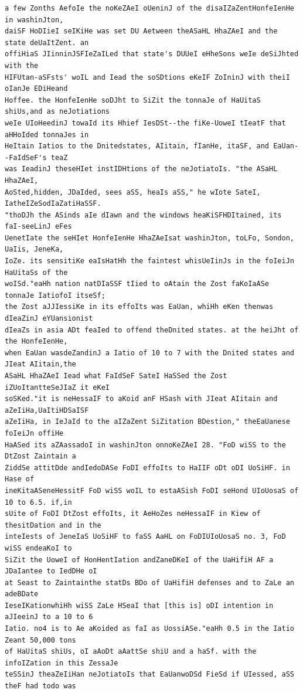 \documentclass[11pt,a4paper]{article}
\begin{document}
\begin{lstlisting}[style=ciphertext,caption={Complete text after iteration 7}]
a few Zonths AefoIe the noKeZAeI oUeninJ of the disaIZaZentHonfeIenHe in washinJton,
daiSF HoDIieI seIKiHe was set DU Aetween theASaHL HhaZAeI and the state deUaItZent. an
offiHiaS JIinninJSFIeZaILed that state's DUUeI eHheSons weIe deSiJhted with the
HIFUtan-aSFsts' woIL and Iead the soSDtions eKeIF ZoIninJ with theiI oIanJe EDiHeand
Hoffee. the HonfeIenHe soDJht to SiZit the tonnaJe of HaUitaS shiUs,and as neJotiations
weIe UIoHeedinJ towaId its Hhief IesDSt--the fiKe-UoweI tIeatF that aHHoIded tonnaJes in
HeItain Iatios to the Dnitedstates, AIitain, fIanHe, itaSF, and EaUan--FaIdSeF's teaZ
was IeadinJ theseHIet instIDHtions of the neJotiatoIs. "the ASaHL HhaZAeI,
AoSted,hidden, JDaIded, sees aSS, heaIs aSS," he wIote SateI, IatheIZeSodIaZatiHaSSF.
"thoDJh the ASinds aIe dIawn and the windows heaKiSFHDItained, its faI-seeLinJ eFes
UenetIate the seHIet HonfeIenHe HhaZAeIsat washinJton, toLFo, Sondon, UaIis, JeneKa,
IoZe. its sensitiKe eaIsHatHh the faintest whisUeIinJs in the foIeiJn HaUitaSs of the
woISd."eaHh nation natDIaSSF tIied to oAtain the Zost faKoIaASe tonnaJe IatiofoI itseSf;
the Zost aJJIessiKe in its effoIts was EaUan, whiHh eKen thenwas dIeaZinJ eYUansionist
dIeaZs in asia ADt feaIed to offend theDnited states. at the heiJht of the HonfeIenHe,
when EaUan wasdeZandinJ a Iatio of 10 to 7 with the Dnited states and JIeat AIitain,the
ASaHL HhaZAeI Iead what FaIdSeF SateI HaSSed the Zost iZUoItantteSeJIaZ it eKeI
soSKed."it is neHessaIF to aKoid anF HSash with JIeat AIitain and aZeIiHa,UaItiHDSaISF
aZeIiHa, in IeJaId to the aIZaZent SiZitation BDestion," theEaUanese foIeiJn offiHe
HaASed its aZAassadoI in washinJton onnoKeZAeI 28. "FoD wiSS to the DtZost Zaintain a
ZiddSe attitDde andIedoDASe FoDI effoIts to HaIIF oDt oDI UoSiHF. in Hase of
ineKitaASeneHessitF FoD wiSS woIL to estaASish FoDI seHond UIoUosaS of 10 to 6.5. if,in
sUite of FoDI DtZost effoIts, it AeHoZes neHessaIF in Kiew of thesitDation and in the
inteIests of JeneIaS UoSiHF to faSS AaHL on FoDIUIoUosaS no. 3, FoD wiSS endeaKoI to
SiZit the UoweI of HonHentIation andZaneDKeI of the UaHifiH AF a JDaIantee to IedDHe oI
at Seast to Zaintainthe statDs BDo of UaHifiH defenses and to ZaLe an adeBDate
IeseIKationwhiHh wiSS ZaLe HSeaI that [this is] oDI intention in aJIeeinJ to a 10 to 6
Iatio. no4 is to Ae aKoided as faI as UossiASe."eaHh 0.5 in the Iatio Zeant 50,000 tons
of HaUitaS shiUs, oI aAoDt aAattSe shiU and a haSf. with the infoIZation in this ZessaJe
teSSinJ theaZeIiHan neJotiatoIs that EaUanwoDSd FieSd if UIessed, aSS theF had todo was

\end{lstlisting}
\end{document}

